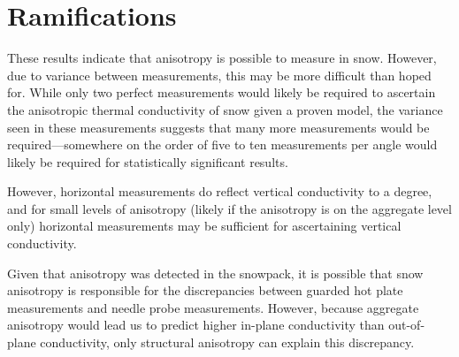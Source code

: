 \section{Ramifications}

These results indicate that anisotropy is possible to measure in snow. However,
due to variance between measurements, this may be more difficult than hoped for.
While only two perfect measurements would likely be required to ascertain the
anisotropic thermal conductivity of snow given a proven model, the variance seen
in these measurements suggests that many more measurements would be
required---somewhere on the order of five to ten measurements per angle would
likely be required for statistically significant results.

However, horizontal measurements do reflect vertical conductivity to a degree,
and for small levels of anisotropy (likely if the anisotropy is on the aggregate
level only) horizontal measurements may be sufficient for ascertaining vertical
conductivity.

Given that anisotropy was detected in the snowpack, it is possible that snow
anisotropy is responsible for the discrepancies between guarded hot plate
measurements and needle probe measurements. However, because aggregate anisotropy
would lead us to predict higher in-plane conductivity than out-of-plane conductivity,
only structural anisotropy can explain this discrepancy.
